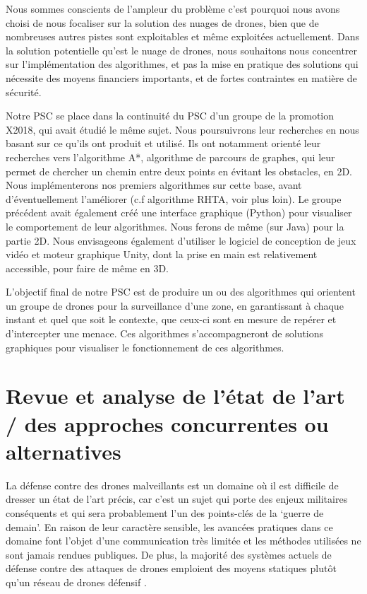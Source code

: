 \documentclass[12pt, openany]{article}
\begin{document}
Nous sommes conscients de l’ampleur du problème c’est pourquoi nous avons choisi de nous focaliser sur la solution des nuages de drones, bien que de nombreuses autres pistes sont exploitables et même exploitées actuellement. Dans la solution potentielle qu’est le nuage de drones, nous souhaitons nous concentrer sur l'implémentation des algorithmes, et pas la mise en pratique des solutions qui nécessite des moyens financiers importants, et de fortes contraintes en matière de sécurité.

Notre PSC se place dans la continuité du PSC d'un groupe de la promotion X2018, qui avait étudié le même sujet. Nous poursuivrons leur recherches en nous basant sur ce qu'ils ont produit et utilisé. Ils ont notamment orienté leur recherches vers l'algorithme A*, algorithme de parcours de graphes, qui leur permet de chercher un chemin entre deux points en évitant les obstacles, en 2D. Nous implémenterons nos premiers algorithmes sur cette base, avant d'éventuellement l'améliorer (c.f algorithme RHTA, voir plus loin). Le groupe précédent avait également créé une interface graphique (Python) pour visualiser le comportement de leur algorithmes. Nous ferons de même (sur Java) pour la partie 2D. Nous envisageons également d'utiliser le logiciel de conception de jeux vidéo et moteur graphique Unity\texttrademark, dont la prise en main est relativement accessible, pour faire de même en 3D.

L'objectif final de notre PSC est de produire un ou des algorithmes qui orientent un groupe de drones pour la surveillance d'une zone, en garantissant à chaque instant et quel que soit le contexte, que ceux-ci sont en mesure de repérer et d'intercepter une menace. Ces algorithmes s'accompagneront de solutions graphiques pour visualiser le fonctionnement de ces algorithmes.


\newpage
\section{Revue et analyse de l’état de l’art / des approches concurrentes ou alternatives}
\vspace{1cm}

La défense contre des drones malveillants est un domaine où il est difficile de dresser un état de l’art précis, car c’est un sujet qui porte des enjeux militaires conséquents et qui sera probablement l’un des points-clés de la ‘guerre de demain’. En raison de leur caractère sensible, les avancées pratiques dans ce domaine font l’objet d’une communication très limitée et les méthodes utilisées ne sont jamais rendues publiques. De plus, la majorité des systèmes actuels de défense contre des attaques de drones emploient des moyens statiques plutôt qu’un réseau de drones défensif \cite{1}  .
\end{document}
